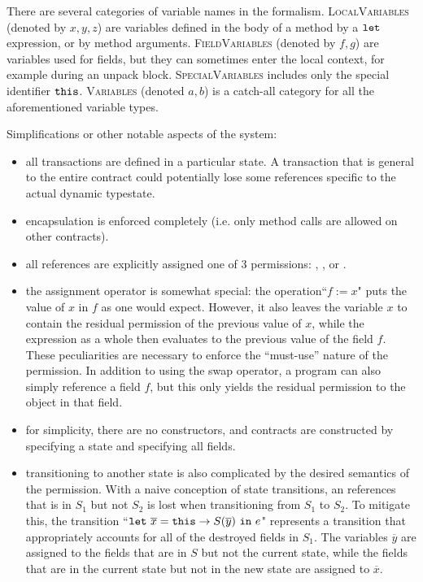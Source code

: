 \documentclass[runningheads,a4paper]{llncs}
\begin{document}
There are several categories of variable names in the formalism. \textsc{LocalVariables} (denoted by $x, y, z$) are variables defined in the body of a method by a $\texttt{let}$ expression, or by method arguments. \textsc{FieldVariables} (denoted by $f, g$) are variables used for fields, but they can sometimes enter the local context, for example during an unpack block. \textsc{SpecialVariables} includes only the special identifier $\texttt{this}$. \textsc{Variables} (denoted $a, b$) is a catch-all category for all the aforementioned variable types.


\iffalse

Simplifications or other notable aspects of the system:
\begin{itemize}
\item all transactions are defined in a particular state. A transaction that is general to the entire contract could potentially lose some \ownedS{} references specific to the actual dynamic typestate.
\item encapsulation is enforced completely (i.e. only method calls are allowed on other contracts).
\item all references are explicitly assigned one of 3 permissions: \readonlyS, \ownedS, or \sharedS.
\item the assignment operator is somewhat special: the operation``$f := x$" puts the value of $x$ in $f$ as one would expect. However, it also leaves the variable $x$ to contain the residual permission of the previous value of $x$, while the expression as a whole then evaluates to the previous value of the field $f$. These peculiarities are necessary to enforce the ``must-use'' nature of the \ownedS{} permission. In addition to using the swap operator, a program can also simply reference a field $f$, but this only yields the residual permission to the object in that field.
\item for simplicity, there are no constructors, and contracts are constructed by specifying a state and specifying all fields.
\item transitioning to another state is also complicated by the desired semantics of the \ownedS{} permission. With a naive conception of state transitions, an \ownedS{} references that is in $S_{1}$ but not $S_{2}$ is lost when transitioning from $S_{1}$ to $S_{2}$. To mitigate this, the transition ``$\letS\ \overline{x} = \thisS \rightarrow S(\overline{y})\ \inS\ e$" represents a transition that appropriately accounts for all of the destroyed fields in $S_{1}$. The variables $\overline{y}$ are assigned to the fields that are in $S$ but not the current state, while the fields that are in the current state but not in the new state are assigned to $\overline{x}$.
\end{itemize}
\end{document}
